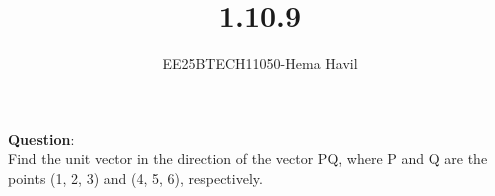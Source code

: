 \documentclass[journal]{IEEEtran}
\begin{document}

\vspace{3cm}
\title{1.10.9}
\author{EE25BTECH11050-Hema Havil}
	\maketitle
	{\let\newpage\relax\maketitle}
	
	\renewcommand{\thefigure}{\theenumi}
	\renewcommand{\thetable}{\theenumi}
	\setlength{\intextsep}{12pt} %
	
	\renewcommand{\thetable}{\theenumi}
	
	\textbf{Question}:\\
    
         Find the unit vector in the direction of the vector PQ, where P and Q are the points (1, 2, 3) and (4, 5, 6), respectively.
         
\end{document}
